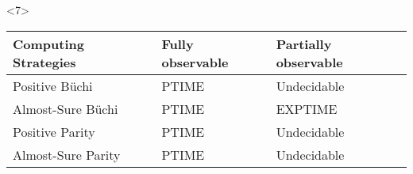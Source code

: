 \documentclass{beamer}
\begin{document}
\begin{frame}
\begin{overlayarea}{\textwidth}{0.8\textheight}
\begin{onlyenv}
\begin{columns}
\begin{column}{0.4\textwidth}
\begin{center}
            \end{center}
          \end{column}
        \end{columns}
      \end{onlyenv}
      \begin{onlyenv}<7>
        \begin{center}
          \begin{tabular}{|l|ll|}
            \hline
            Computing Strategies & Fully observable & Partially observable\\
            \hline
            Positive Büchi & \textsc{PTIME} & Undecidable \\
            Almost-Sure Büchi & \textsc{PTIME} & \textsc{EXPTIME} \\
            Positive Parity & \textsc{PTIME} & Undecidable \\
            Almost-Sure Parity & \textsc{PTIME} & Undecidable \\
            \hline
          \end{tabular}
        \end{center}
      \end{onlyenv}
    \end{overlayarea}
  \end{frame}
\end{document}
